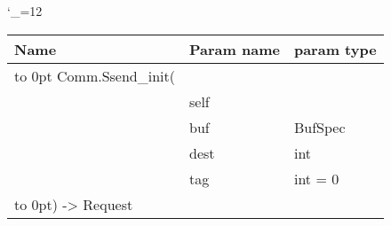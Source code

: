 \begingroup \catcode`\_=12 \tt
\begin{tabular}{lll}
\toprule
\textrm{Name}&\textrm{Param name}&\textrm{param type}\\
\midrule
\hbox to 0pt {Comm.Ssend_init(\hss}\\
& self\\
& buf & BufSpec\\
& dest & int\\
& tag & int = 0\\
\hbox to 0pt{) -> Request\hss}\\
\bottomrule
\end{tabular}
\endgroup
